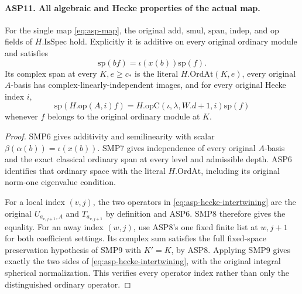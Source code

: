 \paragraph{ASP11. All algebraic and Hecke properties of the actual map.}
\label{claim:ASP11}
For the single map \eqref{eq:asp-map}, the
original $\mathrm{add}$, $\mathrm{smul}$,
$\mathrm{span}$, $\mathrm{indep}$, and
$\mathrm{op}$ fields of $H.\mathrm{IsSpec}$ hold.
Explicitly it is additive on every original
ordinary module and satisfies
\[
                \mathrm{sp}(bf)=\iota(x(b))\mathrm{sp}(f).
\]
Its complex span at every $K,e\geq c_*$ is
the literal $H.\mathrm{OrdAt}(K,e)$, every
original $A$-basis has complex-linearly-independent
images, and for every original Hecke index $i$,
\begin{equation}\label{eq:asp-hecke-intertwining}
              \mathrm{sp}(H.\mathrm{op}(A,i)f)
                  =H.\mathrm{opC}(\iota,\lambda,W.d+1,i)
                                                   \mathrm{sp}(f)
\end{equation}
whenever $f$ belongs to the original ordinary module
at $K$.
\begin{proof}
SMP6 gives additivity and semilinearity with scalar
$\beta(\alpha(b))=\iota(x(b))$.
SMP7 gives independence of every original
$A$-basis and the exact classical ordinary span
at every level and admissible depth.  ASP6
identifies that ordinary space with the literal
$H.\mathrm{OrdAt}$, including its original
norm-one eigenvalue condition.

For a local index $(v,j)$, the two operators
in \eqref{eq:asp-hecke-intertwining} are the
original $U_{a_{v,j+1},A}$ and
$T_{a_{v,j+1}}$ by definition and ASP6.
SMP8 therefore gives the equality.  For an
away index $(w,j)$, use ASP8's one fixed
finite list at $w,j+1$ for both coefficient
settings.  Its complex sum satisfies the
full fixed-space preservation hypothesis of
SMP9 with $K'=K$, by ASP8.  Applying SMP9
gives exactly the two sides of
\eqref{eq:asp-hecke-intertwining}, with the
original integral spherical normalization.
This verifies every operator index rather
than only the distinguished ordinary operator.
\end{proof}

